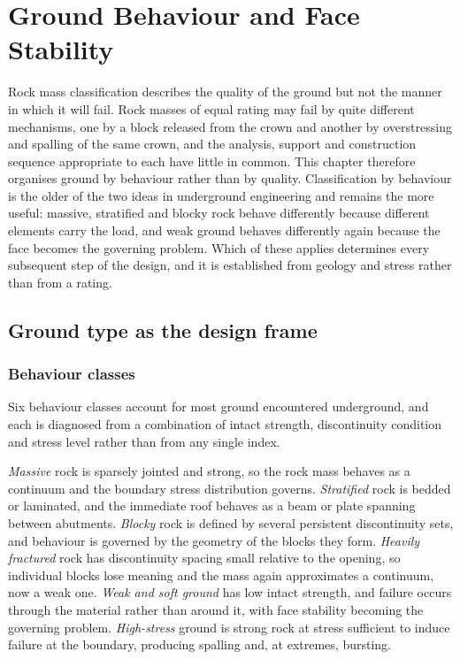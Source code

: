 \chapter{Ground Behaviour and Face Stability}
\label{ch:ground-behaviour}

Rock mass classification describes the quality of the ground but not the
manner in which it will fail. Rock masses
of equal rating may fail by quite different mechanisms, one by a block
released from the crown and another by overstressing and spalling of the same
crown, and the analysis, support and construction sequence appropriate to each
have little in common. This chapter therefore organises ground by behaviour
rather than by quality. Classification by behaviour is the older of the two ideas in
underground engineering and remains the more useful: massive, stratified and
blocky rock behave differently because different elements carry the load, and
weak ground behaves differently again because the face becomes the governing
problem. Which of these applies determines every subsequent step of the
design, and it is established from geology and stress rather than from a
rating.

\section{Ground type as the design frame}
\label{sec:ground-type-frame}

\subsection{Behaviour classes}
\label{sec:behaviour-classes}

Six behaviour classes account for most ground encountered underground, and
each is diagnosed
from a combination of intact strength, discontinuity condition and stress
level rather than from any single index.

\emph{Massive} rock is sparsely jointed and strong, so the rock mass behaves
as a continuum and the boundary stress distribution governs.
\emph{Stratified} rock is bedded or laminated, and the immediate roof behaves
as a beam or plate spanning between abutments. \emph{Blocky} rock is defined by
several persistent discontinuity sets, and behaviour is governed by the
geometry of the blocks they form. \emph{Heavily fractured} rock has
discontinuity spacing small relative to the opening, so individual blocks lose
meaning and the mass again approximates a continuum, now a weak one.
\emph{Weak and soft ground} has low intact strength, and failure occurs
through the material rather than around it, with face stability becoming the
governing problem. \emph{High-stress} ground is strong rock at stress
sufficient to induce failure at the boundary, producing spalling and, at
extremes, bursting.

